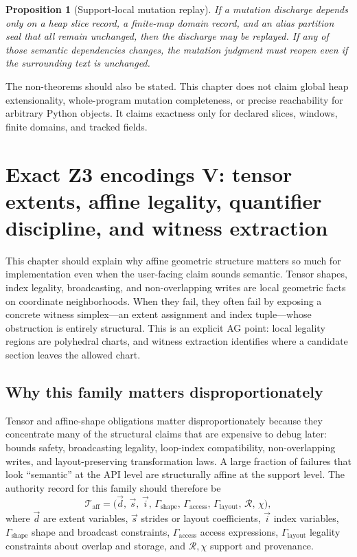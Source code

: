 \documentclass[11pt]{report}
\newtheorem{proposition}[definition]{Proposition}
\begin{document}
\begin{proposition}[Support-local mutation replay]
If a mutation discharge depends only on a heap slice record, a finite-map domain record, and an alias partition seal that all remain unchanged, then the discharge may be replayed. If any of those semantic dependencies changes, the mutation judgment must reopen even if the surrounding text is unchanged.
\end{proposition}

The non-theorems should also be stated. This chapter does not claim global heap extensionality, whole-program mutation completeness, or precise reachability for arbitrary Python objects. It claims exactness only for declared slices, windows, finite domains, and tracked fields.
\chapter{Exact Z3 encodings V: tensor extents, affine legality, quantifier discipline, and witness extraction}
This chapter should explain why affine geometric structure matters so much for implementation even when the user-facing claim sounds semantic. Tensor shapes, index legality, broadcasting, and non-overlapping writes are local geometric facts on coordinate neighborhoods. When they fail, they often fail by exposing a concrete witness simplex---an extent assignment and index tuple---whose obstruction is entirely structural. This is an explicit AG point: local legality regions are polyhedral charts, and witness extraction identifies where a candidate section leaves the allowed chart.
\section{Why this family matters disproportionately}
Tensor and affine-shape obligations matter disproportionately because they concentrate many of the structural claims that are expensive to debug later: bounds safety, broadcasting legality, loop-index compatibility, non-overlapping writes, and layout-preserving transformation laws. A large fraction of failures that look ``semantic'' at the API level are structurally affine at the support level. The authority record for this family should therefore be
\[
\mathcal{T}_{\mathrm{aff}}
=
\bigl(
\vec{d},\,
\vec{s},\,
\vec{i},\,
\Gamma_{\mathrm{shape}},\,
\Gamma_{\mathrm{access}},\,
\Gamma_{\mathrm{layout}},\,
\mathcal{R},\,
\chi
\bigr),
\]
where $\vec{d}$ are extent variables, $\vec{s}$ strides or layout coefficients, $\vec{i}$ index variables, $\Gamma_{\mathrm{shape}}$ shape and broadcast constraints, $\Gamma_{\mathrm{access}}$ access expressions, $\Gamma_{\mathrm{layout}}$ legality constraints about overlap and storage, and $\mathcal{R},\chi$ support and provenance.
\end{document}
